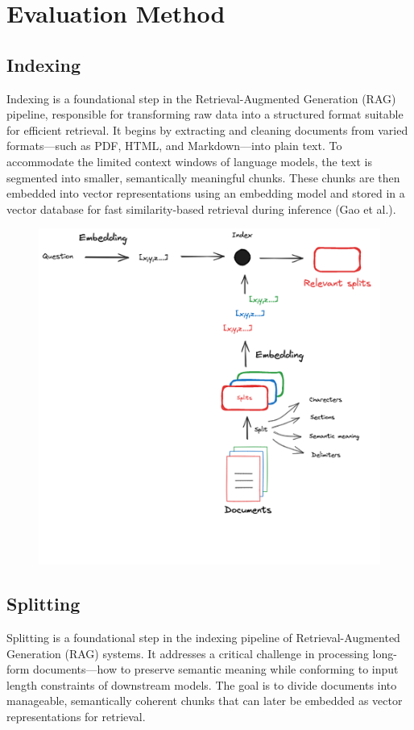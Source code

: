 \documentclass[twocolumn, 10pt]{article}
\begin{document}
\section{Evaluation Method}

\subsection{Indexing}
Indexing is a foundational step in the Retrieval-Augmented Generation (RAG) pipeline, responsible for transforming raw data into a structured format suitable for efficient retrieval. It begins by extracting and cleaning documents from varied formats—such as PDF, HTML, and Markdown—into plain text. To accommodate the limited context windows of language models, the text is segmented into smaller, semantically meaningful chunks. These chunks are then embedded into vector representations using an embedding model and stored in a vector database for fast similarity-based retrieval during inference (Gao et al.).
\begin{figure}[H]
    \centering
     \includegraphics[width=0.5\linewidth]{firstimage.jpg}
    \caption{}
    \label{fig:indexing-process}
\end{figure}


\subsection{Splitting}

Splitting is a foundational step in the indexing pipeline of Retrieval-Augmented Generation (RAG) systems. It addresses a critical challenge in processing long-form documents—how to preserve semantic meaning while conforming to input length constraints of downstream models. The goal is to divide documents into manageable, semantically coherent chunks that can later be embedded as vector representations for retrieval.
\end{document}
